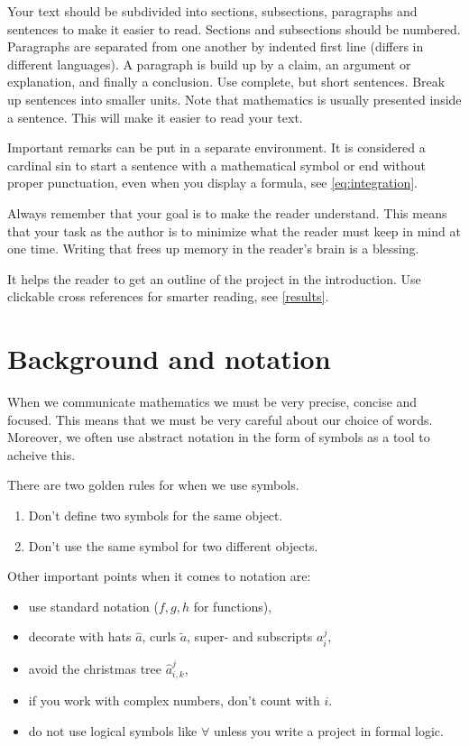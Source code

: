 \documentclass[UKenglish,bachelor]{uiomaster}  %
\begin{document}
Your text should be subdivided into sections, subsections, paragraphs and sentences to make it easier to read. Sections and subsections should be numbered. Paragraphs are separated from one another by indented first line (differs in different languages). A paragraph is build up by a claim, an argument or explanation, and finally a conclusion. Use complete, but short sentences. Break up sentences into smaller units. Note that mathematics is usually presented inside a sentence. This will make it easier to read your text.

\begin{remark}
Important remarks can be put in a separate environment. It is considered a cardinal sin to start a sentence with a mathematical symbol or end without proper punctuation, even when you display a formula, see \vref{eq:integration}. 
\end{remark}

Always remember that your goal is to make the reader understand. This means that your task as the author is to minimize what the reader must keep in mind at one time. Writing that frees up memory in the reader's brain is a blessing.

It helps the reader to get an outline of the project in the introduction. Use clickable cross references for smarter reading, see \cref{results}.

\section{Background and notation}        %
When we communicate mathematics we must be very precise, concise and focused. This means that we must be very careful about our choice of words. Moreover, we often use abstract notation in the form of symbols as a tool to acheive this.

There are two golden rules for when we use symbols.
\begin{enumerate}
    \item Don't define two symbols for the same object.
    \item Don't use the same symbol for two different objects.
\end{enumerate}

\noindent Other important points when it comes to notation are:
\begin{itemize}
    \item use standard notation ($f,g,h$ for functions),
    \item decorate with hats $\hat{a}$, curls $\tilde{a}$, super- and subscripts $a_i^j$,
    \item avoid the christmas tree $\hat{a}_{i,k}^j$,
    \item if you work with complex numbers, don't count with $i$.
    \item do not use logical symbols like $\forall$ unless you write a project in formal logic.
\end{itemize}
\end{document}
